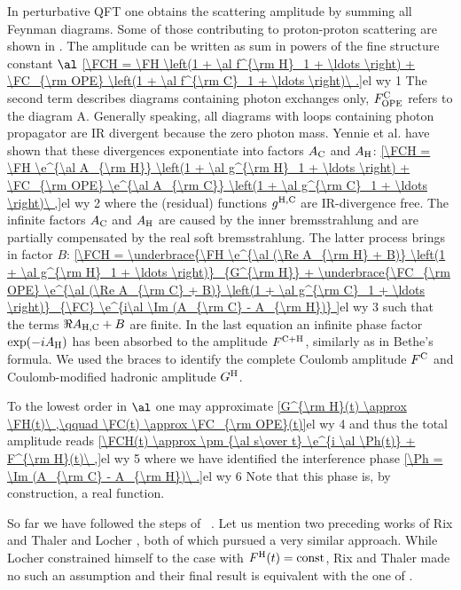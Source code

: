 In perturbative QFT one obtains the scattering amplitude by summing all Feynman diagrams. Some of those contributing to proton-proton scattering are shown in . The amplitude can be written as sum in powers of the fine structure constant $\al$
\eqref{\FCH = \FH \left(1 + \al f^{\rm H}_1 + \ldots \right) + \FC_{\rm OPE} \left(1 + \al f^{\rm C}_1 + \ldots \right)\ .}{el wy 1}
The second term describes diagrams containing photon exchanges only, $F^{\rm C}_{\rm OPE}$ refers to the diagram A. Generally speaking, all diagrams with loops containing photon propagator are IR divergent because the zero photon mass. Yennie et al.  have shown that these divergences exponentiate into factors $A_{\rm C}$ and $A_{\rm H}$:
\eqref{\FCH = \FH \e^{\al A_{\rm H}} \left(1 + \al g^{\rm H}_1 + \ldots \right) + \FC_{\rm OPE} \e^{\al A_{\rm C}} \left(1 + \al g^{\rm C}_1 + \ldots \right)\ ,}{el wy 2}
where the (residual) functions $g^{\rm H, C}$ are IR-divergence free. The infinite factors $A_{\rm C}$ and $A_{\rm H}$ are caused by the inner bremsstrahlung and are partially compensated by the real soft bremsstrahlung. The latter process brings in factor $B$:
\eqref{\FCH =
\underbrace{\FH \e^{\al (\Re A_{\rm H} + B)} \left(1 + \al g^{\rm H}_1 + \ldots \right)}_{G^{\rm H}}
+
\underbrace{\FC_{\rm OPE} \e^{\al (\Re A_{\rm C} + B)} \left(1 + \al g^{\rm C}_1 + \ldots \right)}_{\FC}
\e^{i\al \Im (A_{\rm C} - A_{\rm H})}
}{el wy 3}
such that the terms $\Re A_{\rm H, C} + B$ are finite. In the last equation an infinite phase factor $\exp(-iA_{\rm H})$ has been absorbed to the amplitude $F^{\rm C+H}$, similarly as in Bethe's formula. We used the braces to identify the complete Coulomb amplitude $F^{\rm C}$ and Coulomb-modified hadronic amplitude $G^{\rm H}$.

To the lowest order in $\al$ one may approximate
\eqref{G^{\rm H}(t) \approx \FH(t)\ ,\qquad \FC(t) \approx \FC_{\rm OPE}(t)}{el wy 4}
and thus the total amplitude reads
\eqref{\FCH(t) \approx \pm {\al s\over t} \e^{i \al \Ph(t)} + F^{\rm H}(t)\ ,}{el wy 5}
where we have identified the interference phase
\eqref{\Ph = \Im (A_{\rm C} - A_{\rm H})\ .}{el wy 6}
Note that this phase is, by construction, a real function.

So far we have followed the steps of \WaY\ . Let us mention two preceding works of Rix and Thaler  and Locher , both of which pursued a very similar approach. While Locher constrained himself to the case with $F^{\rm H}(t) = \hbox{const}$, Rix and Thaler made no such an assumption and their final result is equivalent with the one of \WY.

